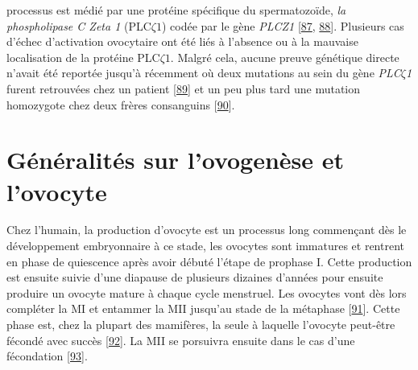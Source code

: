 \documentclass[12pt,a4paper,twoside]{ugathesis}
\theoremstyle{definition}
\theoremstyle{definition}
\theoremstyle{definition}
\theoremstyle{remark}
\begin{document}
\begin{enumerate}
  processus est médié par une protéine spécifique du spermatozoïde,
  \emph{la phospholipase C Zeta 1} (PLC\(\zeta 1\)) codée par le gène
  \emph{PLCZ1} {[}\protect\hyperlink{ref-Nomikos2013}{87},
  \protect\hyperlink{ref-Amdani2013}{88}{]}. Plusieurs cas d'échec
  d'activation ovocytaire ont été liés à l'absence ou à la mauvaise
  localisation de la protéine PLC\(\zeta1\). Malgré cela, aucune preuve
  génétique directe n'avait été reportée jusqu'à récemment où deux
  mutations au sein du gène \emph{PLC}\(\zeta\)\emph{1} furent
  retrouvées chez un patient
  {[}\protect\hyperlink{ref-Heytens2009}{89}{]} et un peu plus tard une
  mutation homozygote chez deux frères consanguins
  {[}\protect\hyperlink{ref-Escoffier2016}{90}{]}.
\end{enumerate}

\newpage  

\section{Généralités sur l'ovogenèse et
l'ovocyte}\label{generalites-sur-lovogenese-et-lovocyte}

Chez l'humain, la production d'ovocyte est un processus long commençant
dès le développement embryonnaire à ce stade, les ovocytes sont
immatures et rentrent en phase de quiescence après avoir débuté l'étape
de prophase I. Cette production est ensuite suivie d'une diapause de
plusieurs dizaines d'années pour ensuite produire un ovocyte mature à
chaque cycle menstruel. Les ovocytes vont dès lors compléter la MI et
entammer la MII jusqu'au stade de la métaphase
{[}\protect\hyperlink{ref-Eppig1996}{91}{]}. Cette phase est, chez la
plupart des mamifères, la seule à laquelle l'ovocyte peut-être fécondé
avec succès {[}\protect\hyperlink{ref-EPPIG2004}{92}{]}. La MII se
porsuivra ensuite dans le cas d'une fécondation
{[}\protect\hyperlink{ref-Tosti2016}{93}{]}.
\end{document}
